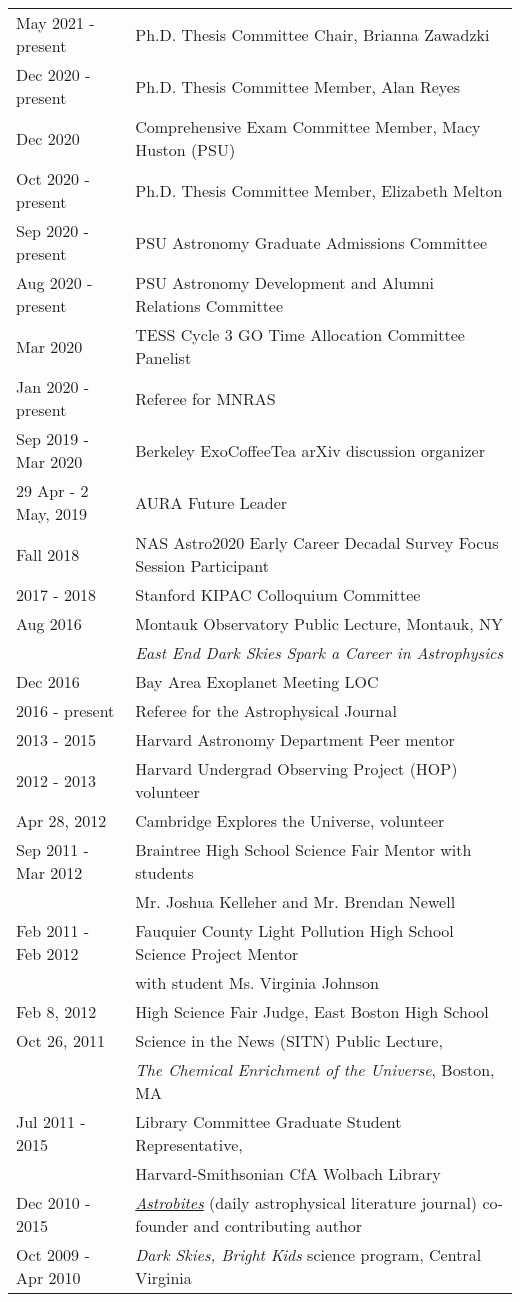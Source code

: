 \begin{tabular*}{\textwidth}{@{\hspace{10pt}}p{1.4in}l}
May 2021 - present & Ph.D. Thesis Committee Chair, Brianna Zawadzki\\
Dec 2020 - present & Ph.D. Thesis Committee Member, Alan Reyes\\
Dec 2020 & Comprehensive Exam Committee Member, Macy Huston (PSU)\\
Oct 2020 - present & Ph.D. Thesis Committee Member, Elizabeth Melton\\
Sep 2020 - present & PSU Astronomy Graduate Admissions Committee \\ 
Aug 2020 - present & PSU Astronomy Development and Alumni Relations Committee \\
Mar 2020 & TESS Cycle 3 GO Time Allocation Committee Panelist \\
Jan 2020 - present & Referee for MNRAS \\ 
Sep 2019 - Mar 2020 & Berkeley ExoCoffeeTea arXiv discussion organizer \\ 
29 Apr - 2 May, 2019 & AURA Future Leader \\
Fall 2018 & NAS Astro2020 Early Career Decadal Survey Focus Session Participant \\
2017 - 2018 & Stanford KIPAC Colloquium Committee \\
Aug 2016 & Montauk Observatory Public Lecture, Montauk, NY \\
&  \emph{East End Dark Skies Spark a Career in Astrophysics}\\
Dec 2016 & Bay Area Exoplanet Meeting LOC \\
2016 - present & Referee for the Astrophysical Journal \\
2013 - 2015 & Harvard Astronomy Department Peer mentor\\
2012 - 2013 & Harvard Undergrad Observing Project (HOP) volunteer\\
Apr 28, 2012 & Cambridge Explores the Universe, volunteer\\
Sep 2011 - Mar 2012 & Braintree High School Science Fair Mentor with students\\
& Mr. Joshua Kelleher and Mr. Brendan Newell\\
Feb 2011 - Feb 2012 & Fauquier County Light Pollution High School Science Project Mentor\\
& with student Ms. Virginia Johnson\\
Feb 8, 2012 & High Science Fair Judge, East Boston High School\\
Oct 26, 2011 & Science in the News (SITN) Public Lecture,\\
& \emph{The Chemical Enrichment of the Universe}, Boston, MA\\
Jul 2011 - 2015 & Library Committee Graduate Student Representative,\\
& Harvard-Smithsonian CfA Wolbach Library\\
Dec 2010 - 2015 & \href{http://astrobites.com/}{\emph{Astrobites}} (daily astrophysical literature journal) co-founder and contributing author\\
Oct 2009 - Apr 2010 & \emph{Dark Skies, Bright Kids} science program, Central Virginia\\
\end{tabular*}
